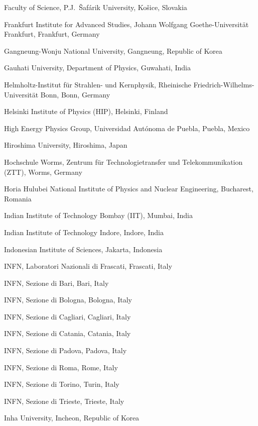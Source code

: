 \begin{flushleft}
\begin{Authlist}
\item {}Faculty of Science, P.J.~\v{S}af\'{a}rik University, Ko\v{s}ice, Slovakia
\item {}Frankfurt Institute for Advanced Studies, Johann Wolfgang Goethe-Universit\"{a}t Frankfurt, Frankfurt, Germany
\item {}Gangneung-Wonju National University, Gangneung, Republic of Korea
\item {}Gauhati University, Department of Physics, Guwahati, India
\item {}Helmholtz-Institut f\"{u}r Strahlen- und Kernphysik, Rheinische Friedrich-Wilhelms-Universit\"{a}t Bonn, Bonn, Germany
\item {}Helsinki Institute of Physics (HIP), Helsinki, Finland
\item {}High Energy Physics Group,  Universidad Aut\'{o}noma de Puebla, Puebla, Mexico
\item {}Hiroshima University, Hiroshima, Japan
\item {}Hochschule Worms, Zentrum  f\"{u}r Technologietransfer und Telekommunikation (ZTT), Worms, Germany
\item {}Horia Hulubei National Institute of Physics and Nuclear Engineering, Bucharest, Romania
\item {}Indian Institute of Technology Bombay (IIT), Mumbai, India
\item {}Indian Institute of Technology Indore, Indore, India
\item {}Indonesian Institute of Sciences, Jakarta, Indonesia
\item {}INFN, Laboratori Nazionali di Frascati, Frascati, Italy
\item {}INFN, Sezione di Bari, Bari, Italy
\item {}INFN, Sezione di Bologna, Bologna, Italy
\item {}INFN, Sezione di Cagliari, Cagliari, Italy
\item {}INFN, Sezione di Catania, Catania, Italy
\item {}INFN, Sezione di Padova, Padova, Italy
\item {}INFN, Sezione di Roma, Rome, Italy
\item {}INFN, Sezione di Torino, Turin, Italy
\item {}INFN, Sezione di Trieste, Trieste, Italy
\item {}Inha University, Incheon, Republic of Korea

\end{Authlist}
\end{flushleft}
